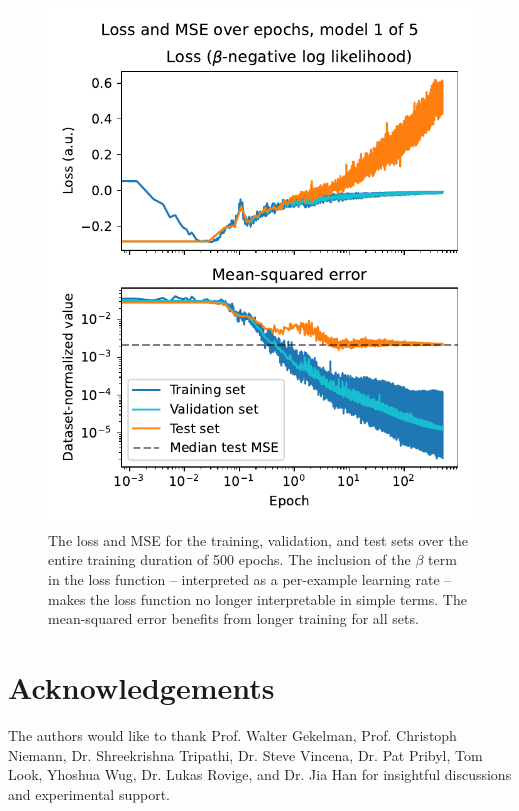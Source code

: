 \begin{figure}
	\includegraphics[width=\columnwidth]{figures/beta-NLL_loss-mse.pdf}
	\caption[size=12]{\label{fig:beta-NLL_loss-mse}The loss and MSE for the training, validation, and test sets over the entire training duration of 500 epochs. The inclusion of the $\beta$ term in the loss function -- interpreted as a per-example learning rate -- makes the loss function no longer interpretable in simple terms. The mean-squared error benefits from longer training for all sets.}
\end{figure}

\section{Acknowledgements}

The authors would like to thank Prof. Walter Gekelman, Prof. Christoph Niemann, Dr. Shreekrishna Tripathi, Dr. Steve Vincena, Dr. Pat Pribyl, Tom Look, Yhoshua Wug, Dr. Lukas Rovige, and Dr. Jia Han for insightful discussions and experimental support.

